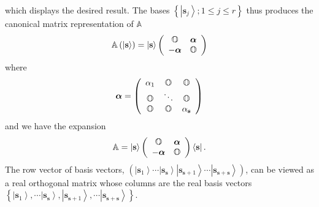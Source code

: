 \documentclass[preprint,aps,showkeys]{revtex4}%
\begin{document}
which displays the desired result. The bases $\left\{  \left\vert
\mathbf{s}_{j}\right\rangle ;1\leq j\leq r\right\}  $ thus produces the
canonical matrix representation of $\mathbb{A}$
\begin{equation}
\mathbb{A}\left(  \left\vert \mathbf{s}\right\rangle \right)  =\left\vert
\mathbf{s}\right\rangle \left(
\begin{array}
[c]{cc}%
\mathbb{O} & \boldsymbol{\alpha}\\
-\boldsymbol{\alpha} & \mathbb{O}%
\end{array}
\right)
\end{equation}
where
\begin{equation}
\boldsymbol{\alpha}=\left(
\begin{array}
[c]{ccc}%
\alpha_{1} & \mathbb{O} & \mathbb{O}\\
\mathbb{O} & \ddots & \mathbb{O}\\
\mathbb{O} & \mathbb{O} & \alpha_{\mathbf{s}}%
\end{array}
\right)
\end{equation}
and we have the expansion
\begin{equation}
\mathbb{A}=\left\vert \mathbf{s}\right\rangle \left(
\begin{array}
[c]{cc}%
\mathbb{O} & \boldsymbol{\alpha}\\
-\boldsymbol{\alpha} & \mathbb{O}%
\end{array}
\right)  \left\langle \mathbf{s}\right\vert . \label{reex}%
\end{equation}
The row vector of basis vectors, $\left(  \left\vert \mathbf{s}_{1}%
\right\rangle \cdots\left\vert \mathbf{s}_{\mathbf{s}}\right\rangle \left\vert
\mathbf{s}_{\mathbf{s}+1}\right\rangle \cdots\left\vert \mathbf{s}%
_{\mathbf{s}+\mathbf{s}}\right\rangle \right)  $, can be viewed as a real
orthogonal matrix whose columns are the real basis vectors $\left\{
\left\vert \mathbf{s}_{1}\right\rangle ,\cdots\left\vert \mathbf{s}%
_{\mathbf{s}}\right\rangle ,\left\vert \mathbf{s}_{\mathbf{s}+1}\right\rangle
,\cdots\left\vert \mathbf{s}_{\mathbf{s}+\mathbf{s}}\right\rangle \right\}  $.
\end{document}
